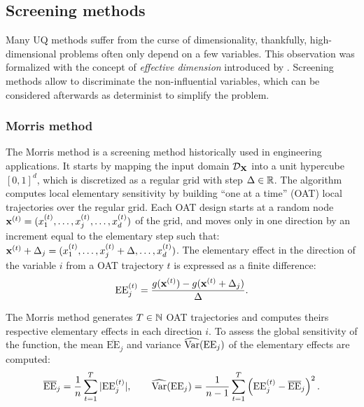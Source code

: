 \subsection{Screening methods}\label{sec:screening}

Many UQ methods suffer from the curse of dimensionality, thankfully, high-dimensional problems often only depend on a few variables. 
This observation was formalized with the concept of \textit{effective dimension} introduced by \citet{owen_2003}. 
Screening methods allow to discriminate the non-influential variables, which can be considered afterwards as determinist to simplify the problem.

\subsubsection{Morris method}

The Morris method \citep{morris_1991} is a screening method historically used in engineering applications. 
It starts by mapping the input domain $\mathcal{D}_{{\bf X}}$ into a unit hypercube $[0, 1]^d$, which is discretized as a regular grid with step $\Delta \in \mathbb{R}$. 
The algorithm computes local elementary sensitivity by building ``one at a time'' (OAT) local trajectories over the regular grid. 
Each OAT design starts at a random node ${\bf x}^{(t)} = (x^{(t)}_1, \dots, x^{(t)}_j,\dots, x^{(t)}_d)$ of the grid, and moves only in one direction by an increment equal to the elementary step such that: ${\bf x}^{(t)} + \Delta_j = (x^{(t)}_1, \dots, x^{(t)}_j + \Delta ,\dots, x^{(t)}_d)$. 
The elementary effect in the direction of the variable $i$ from a OAT trajectory $t$ is expressed as a finite difference: 
\begin{equation}
    \mathrm{EE}_j^{(t)} = \frac{g({\bf x}^{(t)}) - g({\bf x}^{(t)} + \Delta_j)}{\Delta}.
    \label{eq:eeffect}
\end{equation}

The Morris method generates $T\in\mathbb{N}$ OAT trajectories and computes theirs respective elementary effects in each direction $i$. 
To assess the global sensitivity of the function, the mean $\overline{\mathrm{EE}}_j$ and variance $\widehat{\operatorname{Var}}(\mathrm{EE}_j)$ of the elementary effects are computed: 
\begin{equation}
    \overline{\mathrm{EE}}_j = \frac1n \sum_{t=1}^{T} |\mathrm{EE}_j^{(t)}|, \qquad 
    \widehat{\operatorname{Var}}(\mathrm{EE}_j) = \frac{1}{n-1} \sum_{t=1}^{T} \left(\mathrm{EE}_j^{(t)} - \overline{\mathrm{EE}}_j\right)^2.
\end{equation}  


